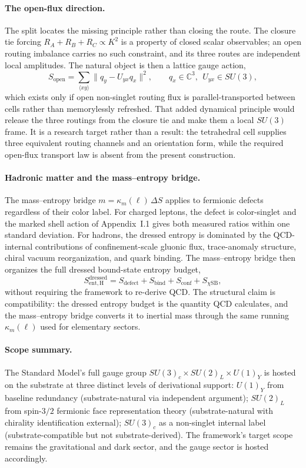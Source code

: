 \documentclass[11pt]{article}
\begin{document}
\paragraph{The open-flux direction.}
The split locates the missing principle rather than closing the route. The closure tie forcing $R_A+R_B+R_C\propto K^2$ is a property of closed scalar observables; an open routing imbalance carries no such constraint, and its three routes are independent local amplitudes. The natural object is then a lattice gauge action,
\[
S_{\mathrm{open}}=\sum_{\langle xy\rangle}\bigl\|q_y-U_{yx}q_x\bigr\|^2,\qquad q_x\in\mathbb C^3,\ \ U_{yx}\in SU(3),
\]
which exists only if open non-singlet routing flux is parallel-transported between cells rather than memorylessly refreshed. That added dynamical principle would release the three routings from the closure tie and make them a local $SU(3)$ frame. It is a research target rather than a result: the tetrahedral cell supplies three equivalent routing channels and an orientation form, while the required open-flux transport law is absent from the present construction.

\paragraph{Hadronic matter and the mass--entropy bridge.}
The mass--entropy bridge $m=\kappa_m(\ell)\,\Delta S$ applies to fermionic defects regardless of their color label. For charged leptons, the defect is color-singlet and the marked shell action of Appendix~I.1 gives both measured ratios within one standard deviation. For hadrons, the dressed entropy is dominated by the QCD-internal contributions of confinement-scale gluonic flux, trace-anomaly structure, chiral vacuum reorganization, and quark binding. The mass--entropy bridge then organizes the full dressed bound-state entropy budget,
\[
S_{\mathrm{ent,H}}^{\mathrm{dressed}}=S_{\mathrm{defect}}+S_{\mathrm{bind}}+S_{\mathrm{conf}}+S_{\chi\mathrm{SB}},
\]
without requiring the framework to re-derive QCD. The structural claim is compatibility: the dressed entropy budget is the quantity QCD calculates, and the mass--entropy bridge converts it to inertial mass through the same running $\kappa_m(\ell)$ used for elementary sectors.

\paragraph{Scope summary.}
The Standard Model's full gauge group $SU(3)_c\times SU(2)_L\times U(1)_Y$ is hosted on the substrate at three distinct levels of derivational support: $U(1)_Y$ from baseline redundancy (substrate-natural via independent argument); $SU(2)_L$ from spin-$3/2$ fermionic face representation theory (substrate-natural with chirality identification external); $SU(3)_c$ as a non-singlet internal label (substrate-compatible but not substrate-derived). The framework's target scope remains the gravitational and dark sector, and the gauge sector is hosted accordingly.
\end{document}
